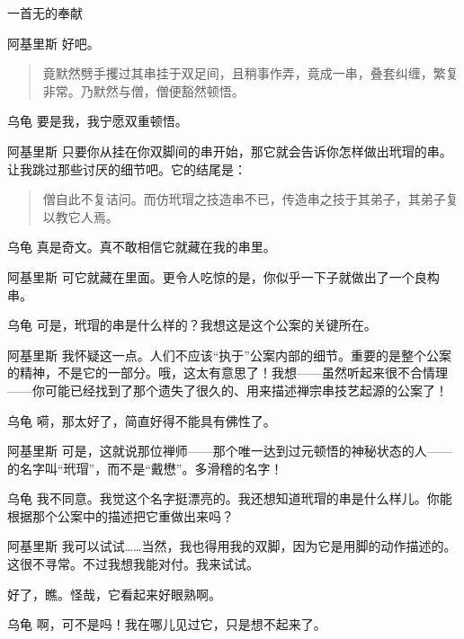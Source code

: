 \begin{dialog}{一首无的奉献\label{abcd}}
\begin{dialogue}
\item[阿基里斯]好吧。
  \begin{quote}
  竟默然劈手攫过其串挂于双足间，且稍事作弄，竟成一串，叠套纠缠，繁复非常。乃默然与僧，僧便豁然顿悟。
  \end{quote}

\item[乌龟]要是我，我宁愿双重顿悟。

\item[阿基里斯]只要你从挂在你双脚间的串开始，那它就会告诉你怎样做出玳瑁的串。让我跳过那些讨厌的细节吧。它的结尾是：
  \begin{quote}
  僧自此不复诘问。而仿玳瑁之技造串不已，传造串之技于其弟子，其弟子复以教它人焉。
  \end{quote}

\item[乌龟]真是奇文。真不敢相信它就藏在我的串里。

\item[阿基里斯]可它就藏在里面。更令人吃惊的是，你似乎一下子就做出了一个良构串。

\item[乌龟]可是，玳瑁的串是什么样的？我想这是这个公案的关键所在。

\item[阿基里斯]我怀疑这一点。人们不应该“执于”公案内部的细节。重要的是整个公案的精神，不是它的一部分。哦，这太有意思了！我想——虽然听起来很不合情理——你可能已经找到了那个遗失了很久的、用来描述禅宗串技艺起源的公案了！

\item[乌龟]嗬，那太好了，简直好得不能具有佛性了。

\item[阿基里斯]可是，这就说那位禅师——那个唯一达到过元顿悟的神秘状态的人——的名字叫“玳瑁”，而不是“戴懋”。多滑稽的名字！

\item[乌龟]我不同意。我觉这个名字挺漂亮的。我还想知道玳瑁的串是什么样儿。你能根据那个公案中的描述把它重做出来吗？

\item[阿基里斯]我可以试试……当然，我也得用我的双脚，因为它是用脚的动作描述的。这很不寻常。不过我想我能对付。我来试试。


好了，瞧。怪哉，它看起来好眼熟啊。

\item[乌龟]啊，可不是吗！我在哪儿见过它，只是想不起来了。


\end{dialogue}
\end{dialog}
